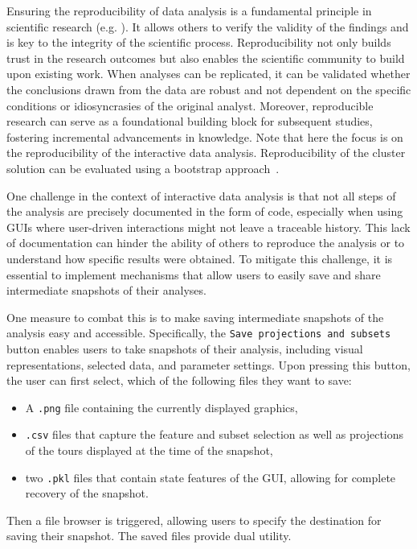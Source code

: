 \documentclass[article]{ajs}
\begin{document}
Ensuring the reproducibility of data analysis is a fundamental principle in scientific research (e.g. \citet{peng2025, gentleman2025}). It allows others to verify the validity of the findings and is key to the integrity of the scientific process. Reproducibility not only builds trust in the research outcomes but also enables the scientific community to build upon existing work. When analyses can be replicated, it can be validated whether the conclusions drawn from the data are robust and not dependent on the specific conditions or idiosyncrasies of the original analyst. Moreover, reproducible research can serve as a foundational building block for subsequent studies, fostering incremental advancements in knowledge. Note that here the focus is on the reproducibility of the interactive data analysis. Reproducibility of the cluster solution can be evaluated using a bootstrap approach~\citep{clusterbootstrap}.

One challenge in the context of interactive data analysis is that not all steps of the analysis are precisely documented in the form of code, especially when using GUIs where user-driven interactions might not leave a traceable history. This lack of documentation can hinder the ability of others to reproduce the analysis or to understand how specific results were obtained. To mitigate this challenge, it is essential to implement mechanisms that allow users to easily save and share intermediate snapshots of their analyses.

One measure to combat this is to make saving intermediate snapshots of the analysis easy and accessible. Specifically, the \texttt{Save projections and subsets} button enables users to take snapshots of their analysis, including visual representations, selected data, and parameter settings. Upon pressing this button, the user can first select, which of the following files they want to save:

\begin{itemize}
    \item A \texttt{.png} file containing the currently displayed graphics,
    \item \texttt{.csv} files that capture the feature and subset selection as well as projections of the tours displayed at the time of the snapshot,
    \item two \texttt{.pkl} files that contain state features of the GUI, allowing for complete recovery of the snapshot.
\end{itemize}

Then a file browser is triggered, allowing users to specify the destination for saving their snapshot. The saved files provide dual utility.
\end{document}
